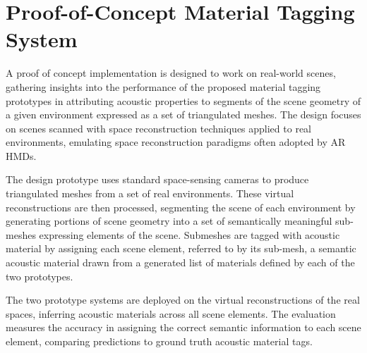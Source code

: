 \chapter{Proof-of-Concept Material Tagging System}
A proof of concept implementation is designed to work on real-world scenes, gathering insights into the performance of the proposed material tagging prototypes in attributing acoustic properties to segments of the scene geometry of a given environment expressed as a set of triangulated meshes. The design focuses on scenes scanned with space reconstruction techniques applied to real environments, emulating space reconstruction paradigms often adopted by AR HMDs.\par
The design prototype uses standard space-sensing cameras to produce triangulated meshes from a set of real environments. These virtual reconstructions are then processed, segmenting the scene of each environment by generating portions of scene geometry into a set of semantically meaningful sub-meshes expressing elements of the scene. Submeshes are tagged with acoustic material by assigning each scene element, referred to by its sub-mesh, a semantic acoustic material drawn from a generated list of materials defined by each of the two prototypes.\par
The two prototype systems are deployed on the virtual reconstructions of the real spaces, inferring acoustic materials across all scene elements. The evaluation measures the accuracy in assigning the correct semantic information to each scene element, comparing predictions to ground truth acoustic material tags.

